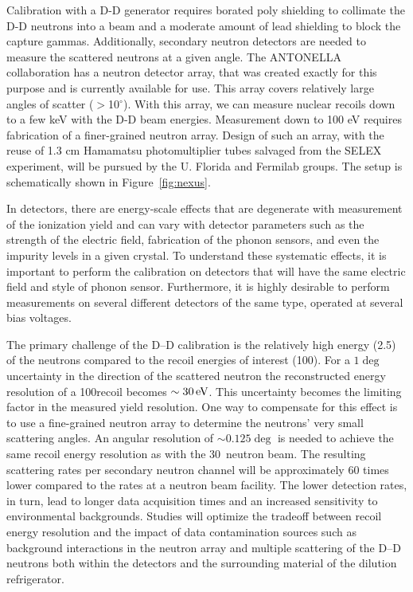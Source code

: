 Calibration with a D-D generator requires borated poly shielding to collimate the D-D neutrons into a beam and a moderate amount of lead shielding to block the capture gammas. Additionally, secondary neutron detectors are needed to measure the scattered neutrons at a given angle.  The ANTONELLA collaboration has a neutron detector array, that was created exactly for this purpose and is currently available for use.  This array covers relatively large angles of scatter ($>$10$^\circ$).  With this array, we can measure nuclear recoils down to a few keV with the D-D beam energies.  Measurement down to 100 eV requires fabrication of a finer-grained neutron array. Design of such an array, with the reuse of 1.3 cm Hamamatsu photomultiplier tubes salvaged from the SELEX experiment, will be pursued by the U. Florida and Fermilab groups. The setup is schematically shown in Figure~\ref{fig:nexus}.


In \SuperCDMS detectors, there are energy-scale effects that are degenerate with measurement of the ionization yield and can vary with detector parameters such as the strength of the electric field, fabrication of the phonon sensors, and even the impurity levels in a given crystal.  To understand these systematic effects, it is important to perform the calibration on detectors that will have the same electric field and style of phonon sensor.  Furthermore, it is highly desirable to perform measurements on several different detectors of the same type, operated at several bias voltages.   

The primary challenge of the D--D calibration is the relatively high energy (2.5\MeV) of the neutrons compared to the recoil energies of interest (100\eV). For a \(1\deg\) uncertainty in the direction of the scattered neutron the reconstructed energy resolution of a 100\eV recoil becomes \(\sim 30\,\mathrm{eV}\). This uncertainty becomes the limiting factor in the measured yield resolution. One way to compensate for this effect is to use a fine-grained neutron array to determine the neutrons' very small scattering angles. An angular resolution of \(\sim0.125\deg\) is needed to achieve the same recoil energy resolution as with the 30\keV\ \tunl neutron beam. The resulting scattering rates per secondary neutron channel will be approximately 60 times lower compared to the rates at a neutron beam facility. The lower detection rates, in turn, lead to longer data acquisition times and an increased sensitivity to environmental backgrounds. Studies will optimize the tradeoff between recoil energy resolution and the impact of data contamination sources such as background interactions in the neutron array and multiple scattering of the D--D neutrons both within the \SuperCDMS detectors and the surrounding material of the dilution refrigerator. 

